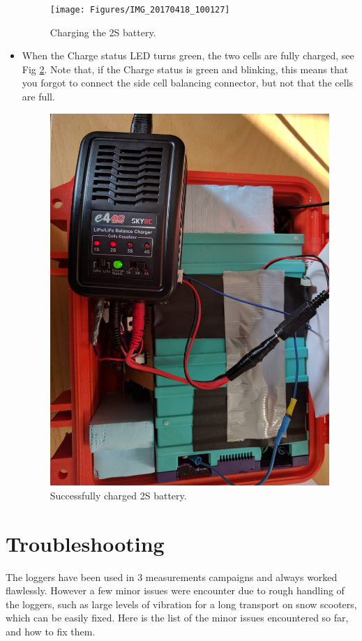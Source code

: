 \documentclass[pdftex,a4paper,12pt,twocolumn,fleqn,captions=tableheading]{scrartcl}
\begin{document}
\begin{itemize}
  \begin{figure}
  \begin{center}
  \texttt{[image: Figures/IMG\_20170418\_100127]}
  \caption{\label{InCharge} Charging the 2S battery.}
  \end{center}
  \end{figure}

  \item When the Charge status LED turns green, the two cells are fully charged, see Fig \ref{Charged2S}. Note that, if the Charge status is green and blinking, this means that you forgot to connect the side cell balancing connector, but not that the cells are full.

  \begin{figure}
  \begin{center}
  \includegraphics[width=.4\textwidth]{Figures/IMG_20170418_102323}
  \caption{\label{Charged2S} Successfully charged 2S battery.}
  \end{center}
  \end{figure}

\end{itemize}

\section{Troubleshooting}

The loggers have been used in  3 measurements campaigns and always worked flawlessly. However a few minor issues were encounter due to rough handling of the loggers, such as large levels of vibration for a long transport on snow scooters, which can be easily fixed. Here is the list of the minor issues encountered so far, and how to fix them.
\end{document}
